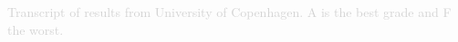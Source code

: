 \documentclass[paper=a4,fontsize=11pt]{article}
\newcommand{\NewPart}[1]{
\vspace{-15pt}
\section*{
{#1}}}
\begin{document}


%
%






\vfill
\vspace{15pt}
\noindent \textcolor{lightgray}{Transcript of results from University of Copenhagen. A is the best grade and F the worst.}\newpage



\end{document}
